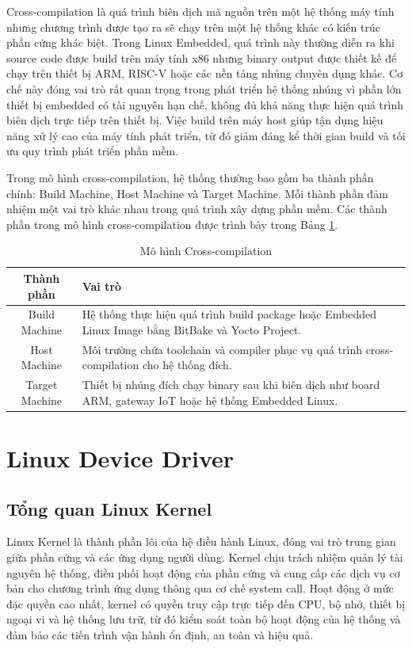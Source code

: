 Cross-compilation là quá trình biên dịch mã nguồn trên một hệ thống máy tính nhưng chương trình được tạo ra sẽ chạy trên một hệ thống khác có kiến trúc phần cứng khác biệt. Trong Linux Embedded, quá trình này thường diễn ra khi source code được build trên máy tính x86 nhưng binary output được thiết kế để chạy trên thiết bị ARM, RISC-V hoặc các nền tảng nhúng chuyên dụng khác. Cơ chế này đóng vai trò rất quan trọng trong phát triển hệ thống nhúng vì phần lớn thiết bị embedded có tài nguyên hạn chế, không đủ khả năng thực hiện quá trình biên dịch trực tiếp trên thiết bị. Việc build trên máy host giúp tận dụng hiệu năng xử lý cao của máy tính phát triển, từ đó giảm đáng kể thời gian build và tối ưu quy trình phát triển phần mềm.

Trong mô hình cross-compilation, hệ thống thường bao gồm ba thành phần chính: Build Machine, Host Machine và Target Machine. Mỗi thành phần đảm nhiệm một vai trò khác nhau trong quá trình xây dựng phần mềm. Các thành phần trong mô hình cross-compilation được trình bày trong Bảng \ref{tab:cross_compile_model}.
\begin{table}[H]
\centering


\begin{tabular}{|c|p{9cm}|}
\hline
\textbf{Thành phần} & \textbf{Vai trò} \\ \hline

Build Machine &
Hệ thống thực hiện quá trình build package hoặc Embedded Linux Image bằng BitBake và Yocto Project. \\ \hline

Host Machine &
Môi trường chứa toolchain và compiler phục vụ quá trình cross-compilation cho hệ thống đích. \\ \hline

Target Machine &
Thiết bị nhúng đích chạy binary sau khi biên dịch như board ARM, gateway IoT hoặc hệ thống Embedded Linux. \\ \hline

\end{tabular}
\caption{Mô hình Cross-compilation}
\label{tab:cross_compile_model}
\end{table}

\section{Linux Device Driver}
\subsection{Tổng quan Linux Kernel}
Linux Kernel là thành phần lõi của hệ điều hành Linux, đóng vai trò trung gian giữa phần cứng và các ứng dụng người dùng. Kernel chịu trách nhiệm quản lý tài nguyên hệ thống, điều phối hoạt động của phần cứng và cung cấp các dịch vụ cơ bản cho chương trình ứng dụng thông qua cơ chế system call.\cite{kernel_org_overview} Hoạt động ở mức đặc quyền cao nhất, kernel có quyền truy cập trực tiếp đến CPU, bộ nhớ, thiết bị ngoại vi và hệ thống lưu trữ, từ đó kiểm soát toàn bộ hoạt động của hệ thống và đảm bảo các tiến trình vận hành ổn định, an toàn và hiệu quả.

